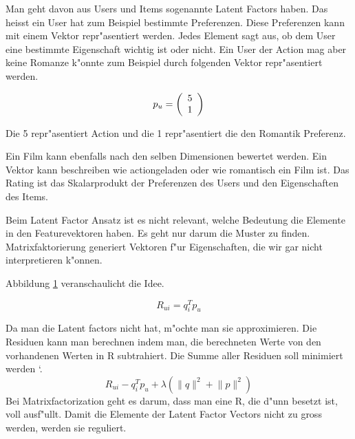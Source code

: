 \documentclass[a4paper, 11pt]{article}
\begin{document}
Man geht davon aus Users und Items sogenannte Latent Factors haben. Das heisst ein User hat zum Beispiel bestimmte Preferenzen. Diese Preferenzen kann mit einem Vektor repr"asentiert werden. Jedes Element sagt aus, ob dem User eine bestimmte Eigenschaft wichtig ist oder nicht. Ein User der Action mag aber keine Romanze k"onnte zum Beispiel durch folgenden Vektor repr"asentiert werden.

\begin{equation}
  \label{eq:vektor}
  p_u = \left(
  \begin{array}[c]{c}
    5 \\
    1 
  \end{array}
\right)
\end{equation}

Die 5 repr"asentiert Action und die 1 repr"asentiert die den Romantik Preferenz.

 Ein Film kann ebenfalls nach den selben Dimensionen bewertet werden. Ein Vektor kann beschreiben wie actiongeladen oder wie romantisch ein Film ist. Das Rating ist das Skalarprodukt der Preferenzen des Users und den Eigenschaften des Items.

Beim Latent Factor Ansatz ist es nicht relevant, welche Bedeutung die Elemente in den Featurevektoren haben. Es geht nur darum die Muster zu finden. Matrixfaktorierung generiert Vektoren f"ur Eigenschaften, die wir gar nicht interpretieren k"onnen.

Abbildung \ref{fig:moviedimension} veranschaulicht die Idee.

\begin{figure}
\label{fig:moviedimension}
\end{figure}

\begin{equation}
  \label{eq:latentfactors}
  R_{ui} = q_i^T p_u
\end{equation}

Da man die Latent factors nicht hat, m"ochte man sie approximieren. Die Residuen kann man berechnen indem man, die berechneten Werte von den vorhandenen Werten in R subtrahiert. Die Summe aller Residuen soll minimiert werden \cite{koren2009}`.
\begin{equation}
  \label{eq:optimization}
    R_{ui} - q_i^T p_u + \lambda (\lVert q \rVert^2 + \lVert p \lVert ^2)
\end{equation}
Bei Matrixfactorization geht es darum, dass man eine R, die d"unn besetzt ist, voll ausf"ullt.
Damit die Elemente der Latent Factor Vectors nicht zu gross werden, werden sie reguliert.
 
\end{document}
